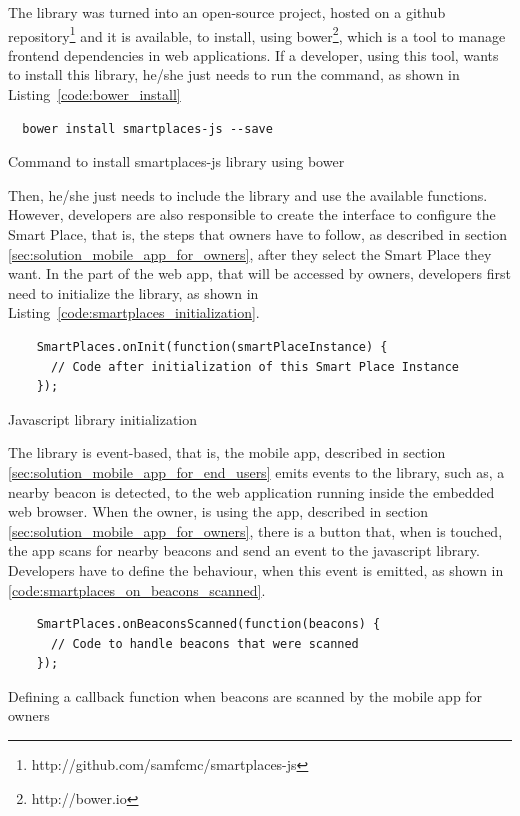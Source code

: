 The library was turned into an open-source project, hosted on a github repository\footnote{http://github.com/samfcmc/smartplaces-js} and it is available, to install, using bower\footnote{http://bower.io}, which is a tool to manage frontend dependencies in web applications.
If a developer, using this tool, wants to install this library, he/she just needs to run the command, as shown in Listing~\ref{code:bower_install}

\begin{listing}[H]
  \begin{verbatim}
  bower install smartplaces-js --save
  \end{verbatim}
  \caption[Install library using Bower]{Command to install smartplaces-js library using bower}
  \label{code:bower_install}
\end{listing}
Then, he/she just needs to include the library and use the available functions.
However, developers are also responsible to create the interface to configure the Smart Place, that is, the steps that owners have to follow, as described in section \ref{sec:solution_mobile_app_for_owners}, after they select the Smart Place they want.
In the part of the web app, that will be accessed by owners, developers first need to initialize the library, as shown in Listing~\ref{code:smartplaces_initialization}.
\begin{listing}[H]
  \begin{verbatim}
    SmartPlaces.onInit(function(smartPlaceInstance) {
      // Code after initialization of this Smart Place Instance
    });
  \end{verbatim}
  \caption[Javascript library initialization]{Javascript library initialization}
  \label{code:smartplaces_initialization}
\end{listing}
The library is event-based, that is, the mobile app, described in section \ref{sec:solution_mobile_app_for_end_users} emits events to the library, such as, a nearby beacon is detected, to the web application running inside the embedded web browser.
When the owner, is using the app, described in section \ref{sec:solution_mobile_app_for_owners}, there is a button that, when is touched, the app scans for nearby beacons and send an event to the javascript library.
Developers have to define the behaviour, when this event is emitted, as shown in \ref{code:smartplaces_on_beacons_scanned}.

\begin{listing}[H]
  \begin{verbatim}
    SmartPlaces.onBeaconsScanned(function(beacons) {
      // Code to handle beacons that were scanned
    });
  \end{verbatim}
  \caption[Beacons scanned]{Defining a callback function when beacons are scanned by the mobile app for owners}
  \label{code:smartplaces_on_beacons_scanned}
\end{listing}

